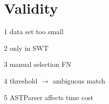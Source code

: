 \documentclass[../main.tex]{subfiles}
\begin{document}
\section{Validity}

1 data set too small

2 only in SWT

3 manual selection FN

4 threshold $\to$ ambiguous match

5 ASTParser affects time cost
\end{document}
